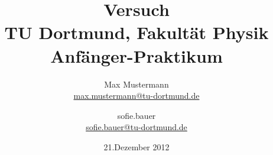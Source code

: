 

\usepackage{wrapfig}
\usepackage{caption}
\usepackage{float}



\title{Versuch\\				%
\large TU Dortmund, Fakultät Physik\\ 
\normalsize Anfänger-Praktikum}

\author{Max Mustermann\\			%
{\small \href{max.mustermann@tu-dortmund.de}{max.mustermann@tu-dortmund.de}}	%
\and						%
sofie.bauer\\					%
{\small \href{sofie.bauer@tu-dortmund.de}{sofie.bauer@tu-dortmund.de}}		%
}
\date{21.Dezember 2012}				%





\maketitle					%
\thispagestyle{empty} 				%



\tableofcontents


\newpage					%


